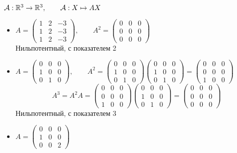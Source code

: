 \begin{egs}
	$ \mathcal{A} : \mathbb{R}^3 \to \mathbb{R}^3, \qquad \mathcal{A} : X \mapsto AX $
	\begin{itemize}
		\item $ A =
		\begin{pmatrix}
			1 & 2 & -3 \\
			1 & 2 & -3 \\
			1 & 2 & -3
		\end{pmatrix}, \qquad A^2 =
		\begin{pmatrix}
			0 & 0 & 0 \\
			0 & 0 & 0 \\
			0 & 0 & 0
		\end{pmatrix} $ \\
		Нильпотентный, с показателем 2
		\item $ A =
		\begin{pmatrix}
			0 & 0 & 0 \\
			1 & 0 & 0 \\
			0 & 1 & 0
		\end{pmatrix}, \qquad A^2 =
		\begin{pmatrix}
			0 & 0 & 0 \\
			1 & 0 & 0 \\
			0 & 1 & 0
		\end{pmatrix}
		\begin{pmatrix}
			0 & 0 & 0 \\
			1 & 0 & 0 \\
			0 & 1 & 0
		\end{pmatrix} =
		\begin{pmatrix}
			0 & 0 & 0 \\
			0 & 0 & 0 \\
			1 & 0 & 0
		\end{pmatrix} $
		$$ A^3 = A^2 A =
		\begin{pmatrix}
			0 & 0 & 0 \\
			0 & 0 & 0 \\
			1 & 0 & 0
		\end{pmatrix}
		\begin{pmatrix}
			0 & 0 & 0 \\
			1 & 0 & 0 \\
			0 & 1 & 0
		\end{pmatrix} =
		\begin{pmatrix}
			0 & 0 & 0 \\
			0 & 0 & 0 \\
			0 & 0 & 0
		\end{pmatrix} $$
		Нильпотентный, с показателем 3
		\item $ A =
		\begin{pmatrix}
			0 & 0 & 0 \\
			1 & 0 & 0 \\
			0 & 0 & 2
		\end{pmatrix} $
	\end{itemize}
\end{egs}

